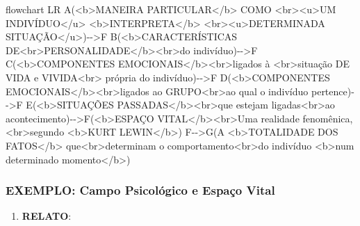 \documentclass[
]{book}
\newenvironment{Shaded}{\begin{snugshade}}{\end{snugshade}}
\newcommand{\NormalTok}[1]{#1}
\providecommand{\tightlist}{%
  \setlength{\itemsep}{0pt}\setlength{\parskip}{0pt}}
\begin{document}
\begin{Shaded}
\begin{Highlighting}[]
\NormalTok{flowchart LR}
\NormalTok{A(\textless{}b\textgreater{}MANEIRA PARTICULAR\textless{}/b\textgreater{} COMO \textless{}br\textgreater{}\textless{}u\textgreater{}UM INDIVÍDUO\textless{}/u\textgreater{} \textless{}b\textgreater{}INTERPRETA\textless{}/b\textgreater{} \textless{}br\textgreater{}\textless{}u\textgreater{}DETERMINADA SITUAÇÃO\textless{}/u\textgreater{}){-}{-}\textgreater{}F}
\NormalTok{B(\textless{}b\textgreater{}CARACTERÍSTICAS DE\textless{}br\textgreater{}PERSONALIDADE\textless{}/b\textgreater{}\textless{}br\textgreater{}do indivíduo){-}{-}\textgreater{}F}
\NormalTok{C(\textless{}b\textgreater{}COMPONENTES EMOCIONAIS\textless{}/b\textgreater{}\textless{}br\textgreater{}ligados à \textless{}br\textgreater{}situação DE VIDA e VIVIDA\textless{}br\textgreater{} própria do indivíduo){-}{-}\textgreater{}F}
\NormalTok{D(\textless{}b\textgreater{}COMPONENTES EMOCIONAIS\textless{}/b\textgreater{}\textless{}br\textgreater{}ligados ao GRUPO\textless{}br\textgreater{}ao qual o indivíduo pertence){-}{-}\textgreater{}F}
\NormalTok{E(\textless{}b\textgreater{}SITUAÇÕES PASSADAS\textless{}/b\textgreater{}\textless{}br\textgreater{}que estejam ligadas\textless{}br\textgreater{}ao acontecimento){-}{-}\textgreater{}F(\textless{}b\textgreater{}ESPAÇO VITAL\textless{}/b\textgreater{}\textless{}br\textgreater{}\textquotesingle{}\textquotesingle{}Uma realidade fenomênica\textquotesingle{}\textquotesingle{},\textless{}br\textgreater{}segundo \textless{}b\textgreater{}KURT LEWIN\textless{}/b\textgreater{})}
\NormalTok{F{-}{-}\textgreater{}G(A \textless{}b\textgreater{}TOTALIDADE DOS FATOS\textless{}/b\textgreater{} que\textless{}br\textgreater{}determinam o comportamento\textless{}br\textgreater{}do indivíduo \textless{}b\textgreater{}num determinado momento\textless{}/b\textgreater{})}
\end{Highlighting}
\end{Shaded}

\hypertarget{exemplo-campo-psicoluxf3gico-e-espauxe7o-vital}{%
\subsubsection{EXEMPLO: Campo Psicológico e Espaço
Vital}\label{exemplo-campo-psicoluxf3gico-e-espauxe7o-vital}}

\begin{enumerate}
\def\labelenumi{\arabic{enumi}.}
\tightlist
\item
  \textbf{RELATO}:
\end{enumerate}
\end{document}
